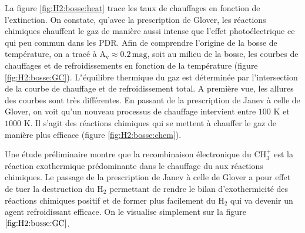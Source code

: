 La figure \ref{fig:H2:bosse:heat} trace les taux de chauffages en fonction de l'extinction. On constate, qu'avec la prescription de Glover, les réactions chimiques chauffent le gaz de manière aussi intense que l'effet photoélectrique ce qui peu commun dans les PDR. Afin de comprendre l'origine de la bosse de température, on a tracé à $\mathrm{A}_\mathrm{v} \approx 0.2 \,\mathrm{mag}$, soit au milieu de la bosse, les courbes de chauffages et de refroidissements en fonction de la température (figure \ref{fig:H2:bosse:GC}). L"équilibre thermique du gaz est déterminée par l'intersection de la courbe de chauffage et de refroidissement total. A première vue, les allures des courbes sont très différentes. En passant de la prescription de Janev à celle de Glover, on voit qu'un nouveau processus de chauffage intervient entre $100$ K et $1000$ K. Il s'agit des réactions chimiques qui se mettent à chauffer le gaz de manière plus efficace (figure \ref{fig:H2:bosse:chem}). \newline

Une étude préliminaire montre que la recombinaison électronique du $\mathrm{CH}_3^+$ est la réaction exothermique prédominante dans le chauffage du aux réactions chimiques. Le passage de la prescription de Janev à celle de Glover a pour effet de tuer la destruction du $\mathrm{H}_2$ permettant de rendre le bilan d'exothermicité des réactions chimiques positif et de former plus facilement du $\mathrm{H}_2$ qui va devenir un agent refroidissant efficace. On le visualise simplement sur la figure $\ref{fig:H2:bosse:GC}$. \newline






